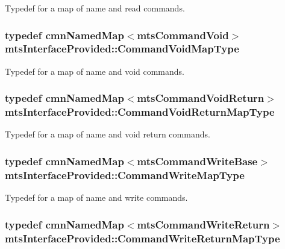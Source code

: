 Typedef for a map of name and read commands. \hypertarget{classmts_interface_provided_af8414fb168541e531244967e0cc1afd2}{
\subsubsection[{Command\-Void\-Map\-Type}]{\setlength{\rightskip}{0pt plus 5cm}typedef {\bf cmn\-Named\-Map}$<${\bf mts\-Command\-Void}$>$ {\bf mts\-Interface\-Provided\-::\-Command\-Void\-Map\-Type}}}\label{classmts_interface_provided_af8414fb168541e531244967e0cc1afd2}
Typedef for a map of name and void commands. \hypertarget{classmts_interface_provided_a963eeb4ba8e38411de4d40f983d5b4b3}{
\subsubsection[{Command\-Void\-Return\-Map\-Type}]{\setlength{\rightskip}{0pt plus 5cm}typedef {\bf cmn\-Named\-Map}$<${\bf mts\-Command\-Void\-Return}$>$ {\bf mts\-Interface\-Provided\-::\-Command\-Void\-Return\-Map\-Type}}}\label{classmts_interface_provided_a963eeb4ba8e38411de4d40f983d5b4b3}
Typedef for a map of name and void return commands. \hypertarget{classmts_interface_provided_ad6809b9c0d16a2eb490429e6adace990}{
\subsubsection[{Command\-Write\-Map\-Type}]{\setlength{\rightskip}{0pt plus 5cm}typedef {\bf cmn\-Named\-Map}$<${\bf mts\-Command\-Write\-Base}$>$ {\bf mts\-Interface\-Provided\-::\-Command\-Write\-Map\-Type}}}\label{classmts_interface_provided_ad6809b9c0d16a2eb490429e6adace990}
Typedef for a map of name and write commands. \hypertarget{classmts_interface_provided_aaf1b5a70c029bb3c3bc2280ae1513c01}{
\subsubsection[{Command\-Write\-Return\-Map\-Type}]{\setlength{\rightskip}{0pt plus 5cm}typedef {\bf cmn\-Named\-Map}$<${\bf mts\-Command\-Write\-Return}$>$ {\bf mts\-Interface\-Provided\-::\-Command\-Write\-Return\-Map\-Type}}}\label{classmts_interface_provided_aaf1b5a70c029bb3c3bc2280ae1513c01}
